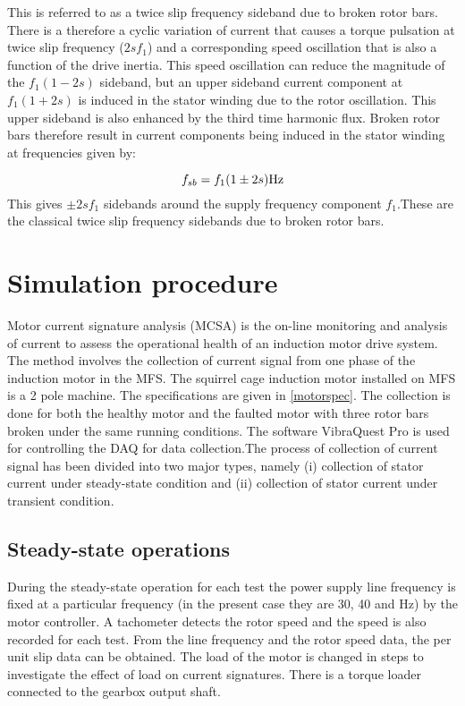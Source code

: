 \documentclass[a4paper,11pt]{report}
\begin{document}
This is referred to as a twice slip frequency sideband due to broken rotor bars. There is a therefore a cyclic variation of current that causes a torque pulsation at twice slip frequency ($2sf_{1}$) and a corresponding speed oscillation that is also a function of the drive inertia. This speed oscillation can reduce the magnitude of the $f_{1}(1-2s)$ sideband, but an upper sideband current component at $f_{1}(1+2s)$ is induced in the stator winding due to the rotor oscillation. This upper sideband is also enhanced by the third time harmonic flux. Broken rotor bars therefore result in current components being induced in the stator winding at frequencies given by:

\begin{equation}
f_{sb}=f_{1}(1\pm2s) \unit[]{Hz} \label{sb}
\end{equation}
This gives $\pm2sf_{1}$ sidebands around the supply frequency component $f_{1}$.These are the classical twice slip frequency sidebands due to broken rotor bars.

\section{Simulation procedure}
Motor current signature analysis (MCSA) is the on-line monitoring and analysis of current to assess the operational health of an induction motor drive system. The method involves the collection of current signal from one phase of the induction motor in the MFS. The squirrel cage induction motor installed on MFS is a 2 pole machine. The specifications are given in \ref{motorspec}. The collection is done for both the healthy motor and the faulted motor with three rotor bars broken under the same running conditions. The software VibraQuest Pro is used for controlling the DAQ for data collection.The process of collection of current signal has been divided into two major types, namely (i) collection of stator current under steady-state condition and (ii) collection of stator current under transient condition.
 
\subsection{Steady-state operations} \label{sso}

During the steady-state operation for each test the power supply line frequency is fixed at a particular frequency (in the present case they are 30, 40 and \unit[50]{Hz}) by the motor controller. A tachometer detects the rotor speed and the speed is also recorded for each test. From the line frequency and the rotor speed data, the per unit slip data can be obtained. The load of the motor is changed in steps to investigate the effect of load on current signatures. There is a torque loader connected to the gearbox output shaft. 
\end{document}
